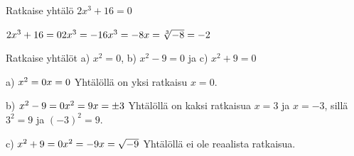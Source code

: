 \begin{esimerkki}
Ratkaise yhtälö $2x^3 + 16 = 0$

	$2x^3 + 16 = 0 \\
	2x^3 = -16 \\
	x^3 = -8  \\
	x = \sqrt[3]{-8} = -2 $
\end{esimerkki}


\begin{esimerkki}
Ratkaise yhtälöt a) $x^2 = 0$, b) $x^2 - 9 = 0$ ja c) $x^2 + 9 = 0$

a)	$x^2 = 0 \\
	x = 0 \\$
	Yhtälöllä on yksi ratkaisu $x = 0$.

b)	$x^2 - 9 = 0 \\
	x^2 = 9 \\
	x = \pm 3 \\$
	Yhtälöllä on kaksi ratkaisua $x = 3$ ja $x = -3$, sillä $3^2 = 9$ ja $(-3)^2 = 9$.

c)	$x^2 + 9 = 0 \\
	x^2 = -9 \\
	x = \sqrt{-9} \\$
	Yhtälöllä ei ole reaalista ratkaisua.

\end{esimerkki}